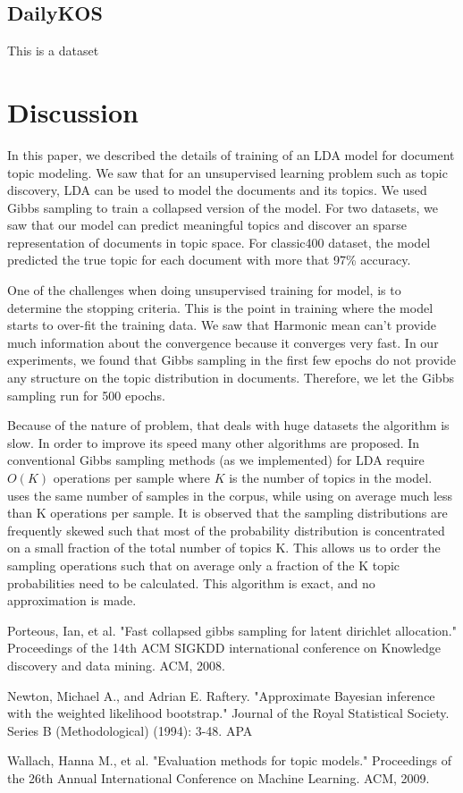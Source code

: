 \documentclass[twoside,12pt]{article}
\begin{document}
\subsection{DailyKOS}
This is a dataset 


\section{Discussion}
In this paper, we described the details of training of an LDA model for document topic modeling. We saw that for an unsupervised learning problem such as topic discovery, LDA can be used to model the documents and its topics. We used Gibbs sampling to train a collapsed version of the model. For two datasets, we saw that our model can predict meaningful topics and discover an sparse representation of documents in topic space. For classic400 dataset, the model predicted the true topic for each document with more that 97\% accuracy.

One of the challenges when doing unsupervised training for model, is to determine the stopping criteria. This is the point in training where the model starts to over-fit the training data. We saw that Harmonic mean can't provide much information about the convergence because it converges very fast. In our experiments, we found that Gibbs sampling in the first few epochs do not provide any structure on the topic distribution in documents. Therefore, we let the Gibbs sampling run for 500 epochs.  

Because of the nature of problem, that deals with huge datasets the algorithm is slow. In order to improve its speed many other algorithms are proposed. In conventional Gibbs sampling methods (as we implemented) for LDA require $O(K)$ operations per sample where $K$ is the number of topics in the model. \cite{fastlda} uses the same number of samples in the corpus, while using on average much less than K operations per sample. It is observed that the sampling distributions are frequently skewed such that most of the probability distribution is concentrated on a small fraction of the total number of topics K. This allows us to order the sampling operations such that on average only a fraction of the K topic probabilities need to be calculated. This algorithm is exact, and no approximation is made.

\begin{thebibliography}{9}
Porteous, Ian, et al. "Fast collapsed gibbs sampling for latent dirichlet allocation." Proceedings of the 14th ACM SIGKDD international conference on Knowledge discovery and data mining. ACM, 2008.


Newton, Michael A., and Adrian E. Raftery. "Approximate Bayesian inference with the weighted likelihood bootstrap." Journal of the Royal Statistical Society. Series B (Methodological) (1994): 3-48.
APA	

Wallach, Hanna M., et al. "Evaluation methods for topic models." Proceedings of the 26th Annual International Conference on Machine Learning. ACM, 2009.

\end{thebibliography}
\end{document}
